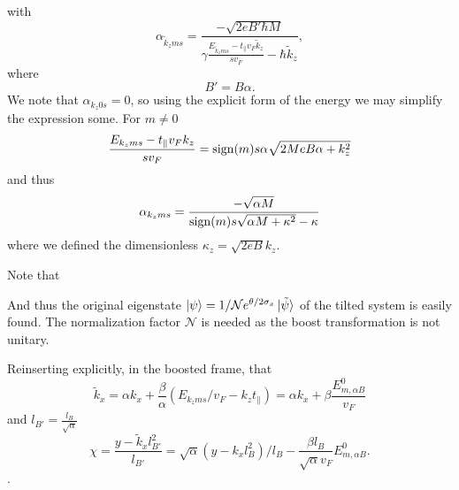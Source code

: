 with
\begin{equation}
  \alpha _{\tilde{k}_z m s} = \frac{-\sqrt{2e B' \hbar M}}{ \gamma \frac{E_{\tilde{k}_z m s} - t_{\parallel} v_{F} \tilde{k}_{z}}{s v_{F}} - \hbar  \tilde{k}_z},
\end{equation}
where
\[
B' = B \alpha.
\]
We note that \( \alpha_{k_z 0 s} = 0 \), so using the explicit form of the energy we may simplify the expression some.
For \( m\neq 0 \)
\[
  \frac{
    E_{k_z m s} - t_{\parallel} v_F k_z
  }{s v_{F}} = \operatorname{sign}(m) s \alpha \sqrt{2 M e B \alpha + k_{z}^2}
\]
and thus
\begin{equation}
  \label{eq:59}
  \alpha_{k_z m s} =
  \frac{-\sqrt{ \alpha M }}{\operatorname{sign}(m) s \sqrt{\alpha M + \kappa^2} - \kappa}
\end{equation}
where we defined the dimensionless \( \kappa_z = \sqrt{2 e B} k_z  \).


Note that


And thus the original eigenstate \(\ket{\psi } = 1 /\mathcal{N} e^{\theta /2 \sigma _{x}} \ket{\tilde{\psi} }\) of the tilted system is easily found.
The normalization factor \( \mathcal{N} \) is needed as the boost transformation is not unitary.


Reinserting explicitly, in the boosted frame, that
\[
  \tilde{k}_{x} = \alpha k_{x} + \frac{\beta}{\alpha} (E_{k_z m s} /v_F- k_{z} t_{\parallel})
  = \alpha k_x + \beta \frac{E^0_{m, \alpha B} }{v_{F}}
\]
and \(l_{B'}=\frac{l_{B}}{\sqrt{\alpha} }\)
\begin{equation}
  \label{eq:60}
  \chi =
  \frac{y-\tilde{k}_{x} l_{B'}^2}{l_{B'}}
  =
  \sqrt{\alpha } (y-k_{x} l_{B}^2) /l_{B}
  - \frac{ \beta l_B }{ \sqrt{\alpha} v_F} E^{0}_{m, \alpha B}.
\end{equation}.


